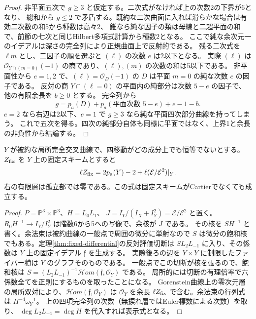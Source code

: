 \begin{proof}
非平面五次で $g\ge3$ と仮定する。二次式がなければ上の次数2の下界が6となり、
総和から $g\le2$ で矛盾する。既約な二次曲面に入れば滑らかな場合は有効二次数の和5から種数は高々2、
錐なら純な因子の類は母線と二超平面の和で、前節の七次と同じHilbert多項式計算から種数2となる。
ここで純な余次元一のイデアルは深さの完全列により正規曲面上で反射的である。
残る二次式を $\ell m$ とし、二因子の順を選ぶと $(\ell)$ の次数 $e$ は2以下となる。
実際 $(\ell)$ は $\mathcal O_{Y\cap(m=0)}(-1)$ の商であり、$(\ell),(m)$ の次数の和は5以下である。
非平面性から $e=1,2$ で、$(\ell)=\mathcal O_{D}(-1)$ の $D$ は平面 $m=0$ の純な次数 $e$ の因子である。
反対の商 $Y\cap(\ell=0)$ の平面内の純部分は次数 $5-e$ の因子で、他の有限余長を $b\ge0$ とする。
完全列から
\[
             g=p_a(D)+p_a(\text{平面次数 }5-e)+e-1-b .
\]
$e=2$ なら右辺は2以下、$e=1$ で $g\ge3$ なら純な平面四次部分曲線を持ってしまう。
これで五次を得る。四次の純部分自体も同様に平面ではなく、上界1と余長の非負性から結論する。
\end{proof}

\begin{proposition}\label{prop:embedded-fixed-length}
$Y$ が被約な局所完全交叉曲線で、四移動がどの成分上でも恒等でないとする。
$Z_{\rm fix}$ を $Y$ 上の固定スキームとすると
\[
        \ell Z_{\rm fix}=2p_a(Y)-2+\ell (\mathcal E/\mathcal E^2)|_Y .
\]
右の有限層は孤立部では零である。この式は固定スキームがCartierでなくても成立する。
\end{proposition}
\begin{proof}
$P=\mathbb P^3\times\mathbb P^3$、$H=L_0L_1$、
$J=I_Y/(I_X+I_Y^2)=\mathcal E/\mathcal E^2$ と置く。
$R_0 H^{-1}\to I_Y/I_Y^2$ は階数6から5への写像で、余核が $J$ である。
その核を $S H^{-1}$ と書く。余法束は被約曲線の一般点で周囲の微分に単射なので
$S$ は微分の飽和核でもある。定理\ref{thm:fixed-differential}の反対評価切断は
$S L_2 L_{-1}$ に入り、その係数は $Y$ 上の固定イデアル $\mathfrak f$ を生成する。
実際後ろの辺を $Y\times Y$ に制限したファイバー積は $Y$ のグラフそのものである。
一般点でこの切断が核を張るので、飽和核は
$S=(L_2 L_{-1})^{-1}\mathcal Hom(\mathfrak f,\mathcal O_Y)$ である。
局所的には切断の有理倍率で六係数全てを正則にするものを取ったことになる。
Gorenstein曲線上の零次元層の局所双対により、$\mathcal Hom(\mathfrak f,\mathcal O_Y)$ は
$\mathcal O_Y$ を余長 $\ell Z_{\rm fix}$ で含む。余法束の行列式は $H^{-4}\omega_Y^{-1}$。
上の四項完全列の次数（無捩れ層ではEuler標数による次数）を取り、
$\deg L_2 L_{-1}=\deg H$ を代入すれば表示式となる。
\end{proof}

